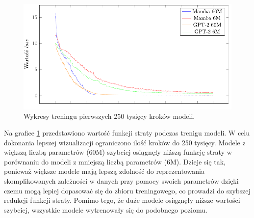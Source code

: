\documentclass[data-science]{agh-wi} %
\begin{document}
\begin{figure}[ht!]
    \centering
    \includegraphics[width=0.9\linewidth]{./img/training_plot.pdf}
    \caption{Wykresy treningu pierwszych 250 tysięcy kroków modeli.}\label{fig:midi_train}
\end{figure}

Na grafice \ref*{fig:midi_train} przedstawiono wartość funkcji straty podczas trenigu modeli. W celu dokonania lepszej wizualizacji ograniczono ilość kroków do 250 tysięcy. Modele z większą liczbą parametrów (60M) szybciej osiągnęły niższą funkcję straty w porównaniu do modeli z mniejszą liczbą parametrów (6M). Dzieje się tak, ponieważ większe modele mają lepszą zdolność do reprezentowania skomplikowanych zależności w danych przy pomocy swoich parametrów dzięki czemu mogą lepiej dopasować się do zbioru treningowego, co prowadzi do szybszej redukcji funkcji straty. Pomimo tego, że duże modele osiągnęły niższe wartości szybciej, wszystkie modele wytrenowały się do podobnego poziomu.
\end{document}
